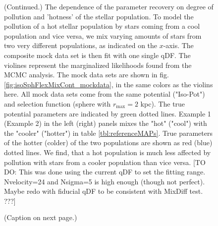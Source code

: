 \addtocounter{figure}{-1}
\begin{figure} [t!]
  \caption{(Continued.) The dependence of the parameter recovery on degree of pollution and 'hotness' of the stellar population. To model the pollution of a hot stellar population by stars coming from a cool population and vice versa, we mix varying amounts of stars from two very different populations, as indicated on the $x$-axis. The composite mock data set is then fit with one single qDF. The violines represent the marginalized likelihoods found from the MCMC analysis. The mock data sets are shown in fig. \ref{fig:isoSphFlexMixCont_mockdata}, in the same colors as the violins here. All mock data sets come from the same potential ("Iso-Pot") and selection function (sphere with $r_\text{max} = 2$ kpc). The true potential parameters are indicated by green dotted lines. Example 1 (Example 2) in the left (right) panels mixes the "hot" ("cool") \MAP with the "cooler" ("hotter") \MAP in table \ref{tbl:referenceMAPs}. True parameters of the hotter (colder) of the two populations are shown as red (blue) dotted lines. We find, that a hot population is much less affected by pollution with stars from a cooler population than vice versa.  [TO DO: This was done using the current qDF to set the fitting range. Nvelocity=24 and Nsigma=5 is high enough (though not perfect). Maybe redo with fiducial qDF to be consistent with MixDiff test. ???]}
\end{figure}


\begin{figure}
\caption{(Caption on next page.)}
\label{fig:isoSphFlexMixDiff}
\end{figure}


